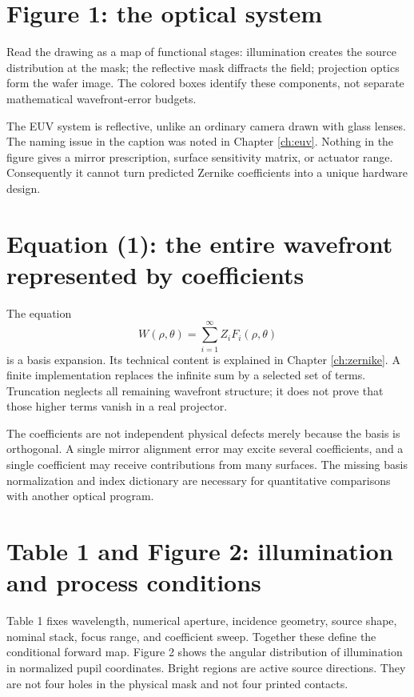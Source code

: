 \section{Figure 1: the optical system}
Read the drawing as a map of functional stages:
illumination creates the source distribution at the mask; the reflective
mask diffracts the field; projection optics form the wafer image.
The colored boxes identify these components, not separate mathematical
wavefront-error budgets.

The EUV system is reflective, unlike an ordinary camera drawn with glass
lenses. The naming issue in the caption was noted in Chapter \ref{ch:euv}.
Nothing in the figure gives a mirror prescription, surface sensitivity
matrix, or actuator range. Consequently it cannot turn predicted
Zernike coefficients into a unique hardware design.

\section{Equation (1): the entire wavefront represented by coefficients}
The equation
\[
W(\rho,\theta)=\sum_{i=1}^{\infty}Z_iF_i(\rho,\theta)
\]
is a basis expansion. Its technical content is explained in
Chapter \ref{ch:zernike}. A finite implementation replaces the infinite
sum by a selected set of terms. Truncation neglects all remaining
wavefront structure; it does not prove that those higher terms vanish
in a real projector.

The coefficients are not independent physical defects merely because
the basis is orthogonal. A single mirror alignment error may excite
several coefficients, and a single coefficient may receive contributions
from many surfaces.
The missing basis normalization and index dictionary are necessary for
quantitative comparisons with another optical program.

\section{Table 1 and Figure 2: illumination and process conditions}
Table 1 fixes wavelength, numerical aperture, incidence geometry,
source shape, nominal stack, focus range, and coefficient sweep.
Together these define the conditional forward map.
Figure 2 shows the angular distribution of illumination in normalized
pupil coordinates. Bright regions are active source directions.
They are not four holes in the physical mask and not four printed contacts.

